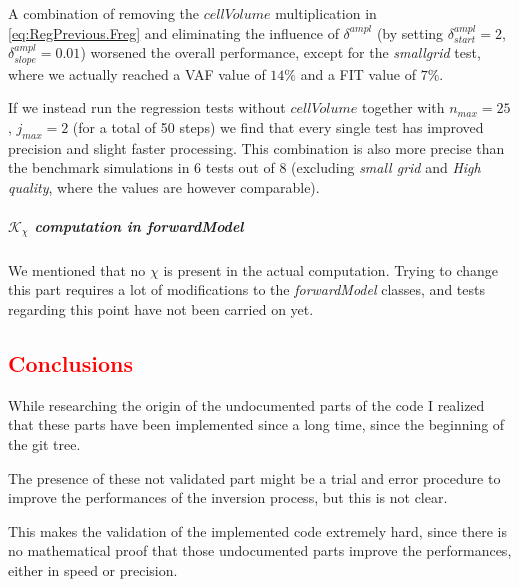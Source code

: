 \documentclass[10pt,a4paper]{article}
\begin{document}
{A combination of removing the $cellVolume$ multiplication in \eqref{eq:RegPrevious.Freg} and eliminating the influence of $\delta^{ampl}$ (by setting $\delta^{ampl}_{start}=2$, $\delta^{ampl}_{slope}=0.01$) worsened the overall performance, except for the \textit{smallgrid} test, where we actually reached a VAF value of $14\%$ and a FIT value of $7\%$.

If we instead run the regression tests without $cellVolume$ together with $n_{max} =25$, $j_{max} =2$ (for a total of 50 steps) we find that every single test has improved precision and slight faster processing.
This combination is also more precise than the benchmark simulations in 6 tests out of 8 (excluding \textit{small grid} and \textit{High quality}, where the values are however comparable).

\subparagraph*{$\mathcal{K}_\chi$ computation in \textit{forwardModel}}
We mentioned that no $\chi$ is present in the actual computation. Trying to change this part requires a lot of modifications to the \textit{forwardModel} classes, and tests regarding this point have not been carried on yet. 

\textcolor{red}
{\section{Conclusions}}
While researching the origin of the undocumented parts of the code I realized that these parts have been implemented since a long time, since the beginning of the git tree. 

The presence of these not validated part might be a trial and error procedure to improve the performances of the inversion process, but this is not clear.




This makes the validation of the implemented code extremely hard, since there is no mathematical proof that those undocumented parts improve the performances, either in speed or precision.

}
\end{document}

